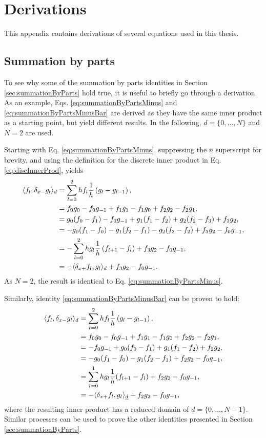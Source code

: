 \chapter{Derivations}\label{app:derivations}
\def\Psilp{\Psi_{l+1}^n}
\def\Psilm{\Psi_{l-1}^n}
\def\Psinp{\Psi_l^{n+1}}
\def\Psinm{\Psi_l^{n-1}}
This appendix contains derivations of several equations used in this thesis. 

\section{Summation by parts}\label{app:summationByParts}
To see why some of the summation by parts identities in Section \ref{sec:summationByParts} hold true, it is useful to briefly go through a derivation. As an example, Eqs. \eqref{eq:summationByPartsMinus} and \eqref{eq:summationByPartsMinusBar} are derived as they have the same inner product as a starting point, but yield different results. In the following, $d=\{0, \hdots, N\}$ and $N = 2$ are used. 

Starting with Eq. \eqref{eq:summationByPartsMinus}, suppressing the $n$ superscript for brevity, and using the definition for the discrete inner product in Eq. \eqref{eq:discInnerProd}, yields
\begin{align*}
    \langle f_l, \delta_{x-} g_l \rangle_d &= \sum_{l = 0}^2 h f_l\frac{1}{h}\left(g_l - g_{l-1}\right),\\
    &= f_0g_0 - f_0g_{-1} + f_1g_1 - f_1g_0 + f_2g_2-f_2g_1,\\
    &= g_0(f_0-f_1) - f_0g_{-1} + g_1(f_1-f_2) + g_2(f_2-f_3) + f_3g_2,\\
    &= -g_0(f_1-f_0)- g_1(f_2-f_1) - g_2(f_3-f_2) + f_3g_2 - f_0g_{-1},\\
    &= -\sum_{l=0}^2 h g_l\frac{1}{h}\left(f_{l+1} - f_l\right) + f_3g_2 - f_0g_{-1},\\
    &= -\langle \delta_{x+} f_l, g_l\rangle_d + f_3g_2 - f_0g_{-1}.
\end{align*}
As $N=2$, the result is identical to Eq. \eqref{eq:summationByPartsMinus}. 

Similarly, identity \eqref{eq:summationByPartsMinusBar} can be proven to hold:
\begin{align*}
    \langle f_l, \delta_{x-} g_l \rangle_d &= \sum_{l = 0}^2 h f_l\frac{1}{h}\left(g_l - g_{l-1}\right),\\
    &= f_0g_0 - f_0g_{-1} + f_1g_1 - f_1g_0 + f_2g_2-f_2g_1,\\
    &= -f_0g_{-1} + g_0(f_0-f_1) + g_1(f_1-f_2) + f_2g_2,\\
    &= - g_0(f_1 - f_0) - g_1(f_2-f_1) + f_2g_2 - f_0g_{-1},\\
    &=\sum_{l=0}^1hg_l\frac{1}{h}(f_{l+1}-f_l) + f_2g_2 - f_0g_{-1},\\
    &= -\langle \delta_{x+} f_l, g_l\rangle_{\underline{d}} + f_2g_2 - f_0g_{-1},
\end{align*}
where the resulting inner product has a reduced domain of $\underline{d} = \{0, \hdots, N-1\}$.
Similar processes can be used to prove the other identities presented in Section \ref{sec:summationByParts}.

